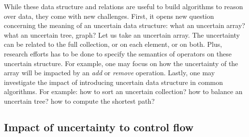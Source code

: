 While these data structure and relations are useful to build algorithms to reason over data, they come with new challenges.
First, it opens new question concerning the meaning of an uncertain data structure: what an uncertain array? what an uncertain tree, graph?
Let us take an uncertain array.
The uncertainty can be related to the full collection, or on each element, or on both.
Plus, research efforts has to be done to specify the semantics of operators on these uncertain structure.
For example, one may focus on how the uncertainty of the array will be impacted by an \textit{add} or \textit{remove} operation.
Lastly, one may investigate the impact of introducing uncertain data structure in common algorithms.
For example: how to sort an uncertain collection? how to balance an uncertain tree? how to compute the shortest path?

\subsection{Impact of uncertainty to control flow}


